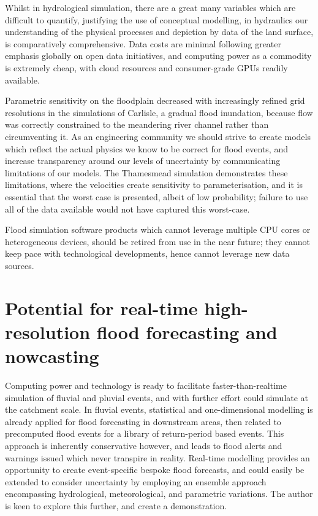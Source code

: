 Whilst in hydrological simulation, there are a great many variables which are difficult to quantify, justifying the use of conceptual modelling, in hydraulics our understanding of the physical processes and depiction by data of the land surface, is comparatively comprehensive. Data costs are minimal following greater emphasis globally on open data initiatives, and computing power as a commodity is extremely cheap, with cloud resources and consumer-grade GPUs readily available.

Parametric sensitivity on the floodplain decreased with increasingly refined grid resolutions in the simulations of Carlisle, a gradual flood inundation, because flow was correctly constrained to the meandering river channel rather than circumventing it. As an engineering community we should strive to create models which reflect the actual physics we know to be correct for flood events, and increase transparency around our levels of uncertainty by communicating limitations of our models. The Thamesmead simulation demonstrates these limitations, where the velocities create sensitivity to parameterisation, and it is essential that the worst case is presented, albeit of low probability; failure to use all of the data available would not have captured this worst-case.

Flood simulation software products which cannot leverage multiple CPU cores or heterogeneous devices, should be retired from use in the near future; they cannot keep pace with technological developments, hence cannot leverage new data sources.

\section{Potential for real-time high-resolution flood forecasting and nowcasting}

Computing power and technology is ready to facilitate faster-than-realtime simulation of fluvial and pluvial events, and with further effort could simulate at the catchment scale. In fluvial events, statistical and one-dimensional modelling is already applied for flood forecasting in downstream areas, then related to precomputed flood events for a library of return-period based events. This approach is inherently conservative however, and leads to flood alerts and warnings issued which never transpire in reality. Real-time modelling provides an opportunity to create event-specific bespoke flood forecasts, and could easily be extended to consider uncertainty by employing an ensemble approach encompassing hydrological, meteorological, and parametric variations. The author is keen to explore this further, and create a demonstration.

